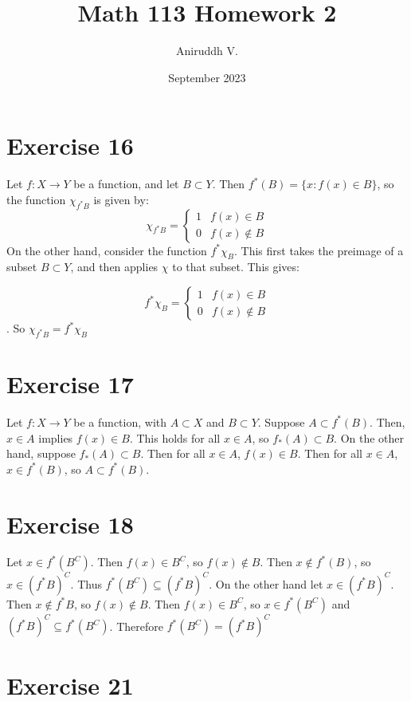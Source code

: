 \documentclass{article}
\title{Math 113 Homework 2}
\author{Aniruddh V.}
\date{September 2023}
\begin{document}
\maketitle

\section{Exercise 16}
Let $f: X \to Y$ be a function, and let $B \subset Y$. Then $f^*(B) = \{ x : f(x) \in B \}$, so the function $\chi_{f^* B}$ is given by:
\[ \chi_{f^* B} = \begin{cases}
    1 & f(x) \in B \\
    0 & f(x) \not\in B
    
\end{cases}\] On the other hand, consider the function $f^* \chi_B$. This first takes the preimage of a subset $B \subset Y$, and then applies $\chi$ to that subset. This gives:

\[ f^* \chi_B = \begin{cases}
    1 & f(x) \in B \\
    0 & f(x) \not\in B 
\end{cases}    
\]. So $\chi_{f^* B} = f^* \chi_B $


\section{Exercise 17}

Let $f: X \to Y$ be a function, with $A \subset X$ and $B \subset Y$. Suppose $A \subset f^*(B)$. Then, $x \in A$ implies $f(x) \in B$. This holds for all $x \in A$, so $f_*(A) \subset B$.
On the other hand, suppose $f_*(A) \subset B$. Then for all $x \in A$, $f(x) \in B$. Then for all $x \in A$, $x \in f^*(B)$, so $A \subset f^*(B)$. 

\section{Exercise 18}

Let $x \in f^*(B^C)$. Then $f(x) \in B^C$, so $f(x) \not\in B$. Then $x \not\in f^*(B)$, so $x \in (f^* B)^C$. Thus $f^* (B^C) \subseteq (f^* B)^C$. On the other hand
let $x \in (f^* B)^C$. Then $x \not\in f^* B$, so $f(x) \not\in B$. Then $f(x) \in B^C$, so $x \in f^*(B^C)$ and $(f^* B)^C \subseteq f^* (B^C)$. Therefore $f^* (B^C) = (f^* B)^C$


\section{Exercise 21}
\end{document}

